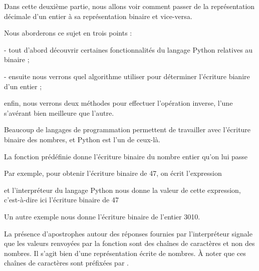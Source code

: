 




\debuttexte

\diapo %

Dans cette deuxième partie, nous allons voir comment passer de la représentation décimale d'un entier à sa représentation binaire et vice-versa.

\change
Nous aborderons ce sujet en trois points :

\change

- tout d'abord découvrir certaines fonctionnalités du langage Python relatives au binaire ;

\change

- ensuite nous verrons quel algorithme utiliser pour déterminer l'écriture bianire d'un entier ;

\change

enfin, nous verrons deux méthodes pour effectuer l'opération inverse, l'une s'avérant bien meilleure que l'autre.

\diapo %

Beaucoup de langages de programmation permettent de travailler avec l'écriture binaire des nombres, et Python est l'un de ceux-là.

\change

La fonction prédéfinie  donne l'écriture binaire du nombre entier qu'on lui passe

\change

Par exemple, pour obtenir l'écriture binaire de 47, on écrit l'expression 

\change
et l'interpréteur du langage Python nous donne la valeur de cette expression, c'est-à-dire ici l'écriture binaire de 47

\change
Un autre exemple  nous donne l'écriture binaire de l'entier 3010.

\change

La présence d'apostrophes autour des réponses fournies par l'interpréteur signale que les valeurs renvoyées par la fonction  sont des chaînes de caractères et non des nombres. Il s'agit bien d'une représentation écrite de nombres. À noter que ces chaînes de caractères sont préfixées par . 


